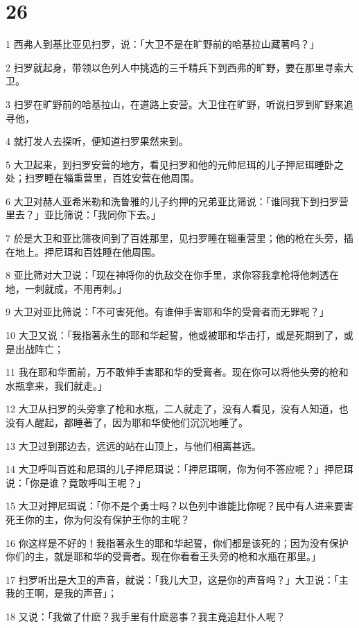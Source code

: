 \chapter{26}

\par 1 西弗人到基比亚见扫罗，说：「大卫不是在旷野前的哈基拉山藏著吗？」
\par 2 扫罗就起身，带领以色列人中挑选的三千精兵下到西弗的旷野，要在那里寻索大卫。
\par 3 扫罗在旷野前的哈基拉山，在道路上安营。大卫住在旷野，听说扫罗到旷野来追寻他，
\par 4 就打发人去探听，便知道扫罗果然来到。
\par 5 大卫起来，到扫罗安营的地方，看见扫罗和他的元帅尼珥的儿子押尼珥睡卧之处；扫罗睡在辎重营里，百姓安营在他周围。
\par 6 大卫对赫人亚希米勒和洗鲁雅的儿子约押的兄弟亚比筛说：「谁同我下到扫罗营里去？」亚比筛说：「我同你下去。」
\par 7 於是大卫和亚比筛夜间到了百姓那里，见扫罗睡在辎重营里；他的枪在头旁，插在地上。押尼珥和百姓睡在他周围。
\par 8 亚比筛对大卫说：「现在神将你的仇敌交在你手里，求你容我拿枪将他刺透在地，一刺就成，不用再刺。」
\par 9 大卫对亚比筛说：「不可害死他。有谁伸手害耶和华的受膏者而无罪呢？」
\par 10 大卫又说：「我指著永生的耶和华起誓，他或被耶和华击打，或是死期到了，或是出战阵亡；
\par 11 我在耶和华面前，万不敢伸手害耶和华的受膏者。现在你可以将他头旁的枪和水瓶拿来，我们就走。」
\par 12 大卫从扫罗的头旁拿了枪和水瓶，二人就走了，没有人看见，没有人知道，也没有人醒起，都睡著了，因为耶和华使他们沉沉地睡了。
\par 13 大卫过到那边去，远远的站在山顶上，与他们相离甚远。
\par 14 大卫呼叫百姓和尼珥的儿子押尼珥说：「押尼珥啊，你为何不答应呢？」押尼珥说：「你是谁？竟敢呼叫王呢？」
\par 15 大卫对押尼珥说：「你不是个勇士吗？以色列中谁能比你呢？民中有人进来要害死王你的主，你为何没有保护王你的主呢？
\par 16 你这样是不好的！我指著永生的耶和华起誓，你们都是该死的；因为没有保护你们的主，就是耶和华的受膏者。现在你看看王头旁的枪和水瓶在那里。」
\par 17 扫罗听出是大卫的声音，就说：「我儿大卫，这是你的声音吗？」大卫说：「主我的王啊，是我的声音」；
\par 18 又说：「我做了什麽？我手里有什麽恶事？我主竟追赶仆人呢？
